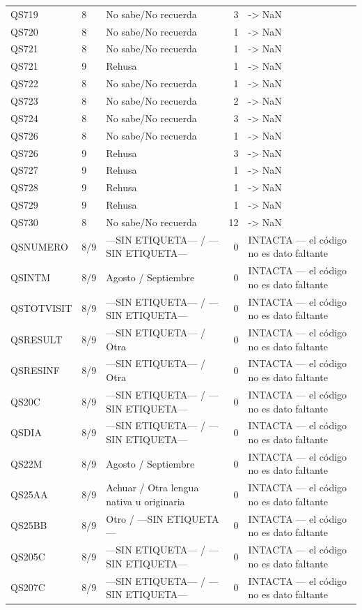 \begin{longtable}{lllrl}
QS719 & 8 & No sabe/No recuerda & 3 & -> NaN \\
QS720 & 8 & No sabe/No recuerda & 1 & -> NaN \\
QS721 & 8 & No sabe/No recuerda & 1 & -> NaN \\
QS721 & 9 & Rehusa & 1 & -> NaN \\
QS722 & 8 & No sabe/No recuerda & 1 & -> NaN \\
QS723 & 8 & No sabe/No recuerda & 2 & -> NaN \\
QS724 & 8 & No sabe/No recuerda & 3 & -> NaN \\
QS726 & 8 & No sabe/No recuerda & 1 & -> NaN \\
QS726 & 9 & Rehusa & 3 & -> NaN \\
QS727 & 9 & Rehusa & 1 & -> NaN \\
QS728 & 9 & Rehusa & 1 & -> NaN \\
QS729 & 9 & Rehusa & 1 & -> NaN \\
QS730 & 8 & No sabe/No recuerda & 12 & -> NaN \\
QSNUMERO & 8/9 & —SIN ETIQUETA— / —SIN ETIQUETA— & 0 & INTACTA — el código no es dato faltante \\
QSINTM & 8/9 & Agosto / Septiembre & 0 & INTACTA — el código no es dato faltante \\
QSTOTVISIT & 8/9 & —SIN ETIQUETA— / —SIN ETIQUETA— & 0 & INTACTA — el código no es dato faltante \\
QSRESULT & 8/9 & —SIN ETIQUETA— / Otra & 0 & INTACTA — el código no es dato faltante \\
QSRESINF & 8/9 & —SIN ETIQUETA— / Otra & 0 & INTACTA — el código no es dato faltante \\
QS20C & 8/9 & —SIN ETIQUETA— / —SIN ETIQUETA— & 0 & INTACTA — el código no es dato faltante \\
QSDIA & 8/9 & —SIN ETIQUETA— / —SIN ETIQUETA— & 0 & INTACTA — el código no es dato faltante \\
QS22M & 8/9 & Agosto / Septiembre & 0 & INTACTA — el código no es dato faltante \\
QS25AA & 8/9 & Achuar / Otra lengua nativa u originaria & 0 & INTACTA — el código no es dato faltante \\
QS25BB & 8/9 & Otro / —SIN ETIQUETA— & 0 & INTACTA — el código no es dato faltante \\
QS205C & 8/9 & —SIN ETIQUETA— / —SIN ETIQUETA— & 0 & INTACTA — el código no es dato faltante \\
QS207C & 8/9 & —SIN ETIQUETA— / —SIN ETIQUETA— & 0 & INTACTA — el código no es dato faltante \\

\end{longtable}
